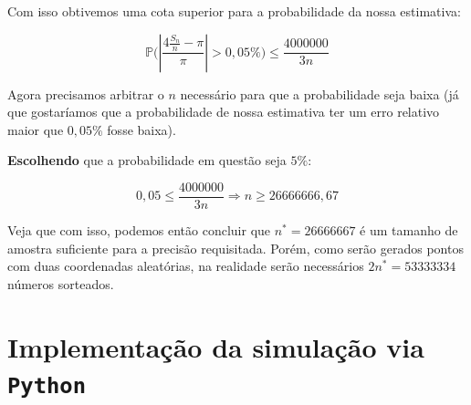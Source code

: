 \documentclass[paper=a4wide, fontsize=10pt]{scrartcl}	 %
\newcommand{\ProbMonstro}[1]{\mathbb{P}\Bigg(#1\Bigg)}
\begin{document}
Com isso obtivemos uma cota superior para a probabilidade da nossa estimativa:

\[
\ProbMonstro{\left|\frac{4\frac{S_n}{n}-\pi}{\pi}\right|>0,05\%}  \leqslant \frac{4000000}{3n}
\]

Agora precisamos arbitrar o \(n\) necessário para que a probabilidade seja baixa (já que gostaríamos que a probabilidade de nossa estimativa ter um erro relativo maior que \(0,05\%\) fosse baixa).

\textbf{Escolhendo} que a probabilidade em questão seja \(5\%\):

\[
0,05 \leqslant \frac{4000000}{3n} \Rightarrow n \geqslant  26666666, 67
\]

Veja que com isso, podemos então concluir que \(n^* = 26666667\) é um tamanho de amostra suficiente para a precisão requisitada. Porém, como serão gerados pontos com duas coordenadas aleatórias, na realidade serão necessários \(2n^* = 53333334\) números sorteados.

\section{Implementação da simulação via \texttt{Python}}
\end{document}
